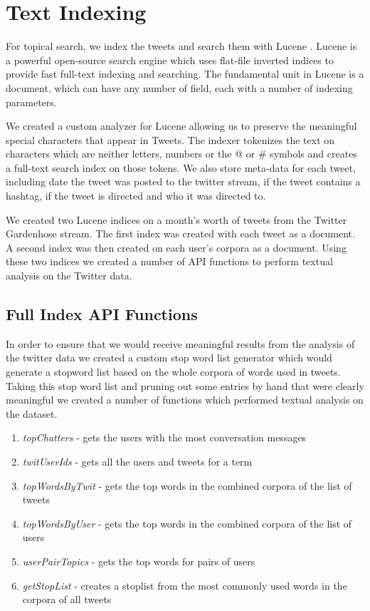 \section{Text Indexing}

For topical search, we index the tweets and search them with Lucene \cite{code:lucene}.
Lucene is a powerful open-source search engine which uses flat-file inverted indices to provide fast full-text indexing and searching.  The fundamental unit in Lucene is a document, which can have any number of field, each with a number of indexing parameters.

We created a custom analyzer for Lucene allowing us to preserve the meaningful special characters that appear in Tweets.  The indexer tokenizes the text on characters which are neither letters, numbers or the @ or \# symbols and creates a full-text search index on those tokens.  We also store meta-data for each tweet, including date the tweet was posted to the twitter stream, if the tweet contains a hashtag, if the tweet is directed and who it was directed to.

We created two Lucene indices on a month's worth of tweets from the Twitter Gardenhose stream.  The first index was created with each tweet as a document.  A second index was then created on each user's corpora as a document.  Using these two indices we created a number of API functions to perform textual analysis on the Twitter data.

\subsection{Full Index API Functions}

In order to ensure that we would receive meaningful results from the analysis of the twitter data we created a custom stop word list generator which would generate a stopword list based on the whole corpora of words used in tweets.  Taking this stop word list and pruning out some entries by hand that were clearly meaningful we created a number of functions which performed textual analysis on the dataset.

\begin{enumerate}
\item \emph{topChatters} - gets the users with the most conversation messages
\item \emph{twitUserIds} - gets all the users and tweets for a term
\item \emph{topWordsByTwit} - gets the top words in the combined corpora of the list of tweets
\item \emph{topWordsByUser} - gets the top words in the combined corpora of the list of users
\item \emph{userPairTopics} - gets the top words for pairs of users
\item \emph{getStopList} - creates a stoplist from the most commonly used words in the corpora of all tweets
\end{enumerate}

